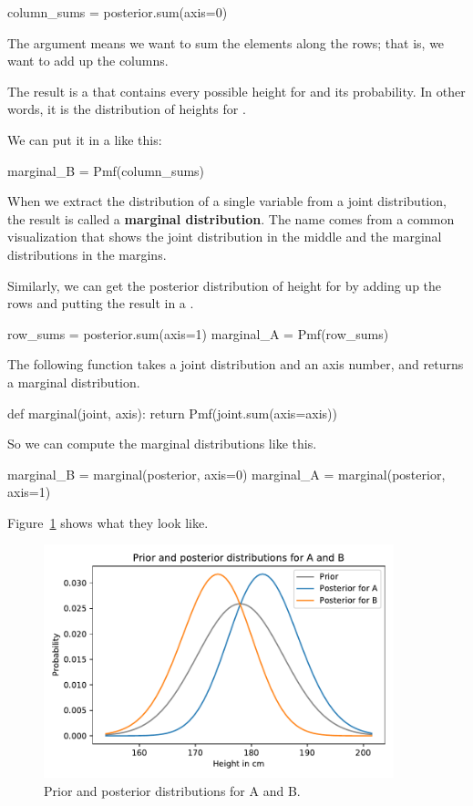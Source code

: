 \documentclass[12pt]{book}
\theoremstyle{exercise}
\begin{document}
\begin{code}
column_sums = posterior.sum(axis=0)
\end{code}

The argument  means we want to sum the elements along the rows; that is, we want to add up the columns.

The result is a  that contains every possible height for  and its probability.  In other words, it is the distribution of heights for .

We can put it in a  like this:

\begin{code}
marginal_B = Pmf(column_sums)
\end{code}

When we extract the distribution of a single variable from a joint distribution, the result is called a {\bf marginal distribution}.
The name comes from a common visualization that shows the joint distribution in the middle and the marginal distributions in the margins.

Similarly, we can get the posterior distribution of height for  by adding up the rows and putting the result in a .

\begin{code}
row_sums = posterior.sum(axis=1)
marginal_A = Pmf(row_sums)
\end{code}

The following function takes a joint distribution and an axis number, and returns a marginal distribution.

\begin{code}
def marginal(joint, axis):
    return Pmf(joint.sum(axis=axis))
\end{code}

So we can compute the marginal distributions like this.

\begin{code}
marginal_B = marginal(posterior, axis=0)
marginal_A = marginal(posterior, axis=1)
\end{code}

Figure~\ref{fig09-04} shows what they look like.

\begin{figure}
\centerline{\includegraphics[width=4in]{figs/fig09-04.pdf}}
\caption{Prior and posterior distributions for A and B.}
\label{fig09-04}
\end{figure}
\end{document}
